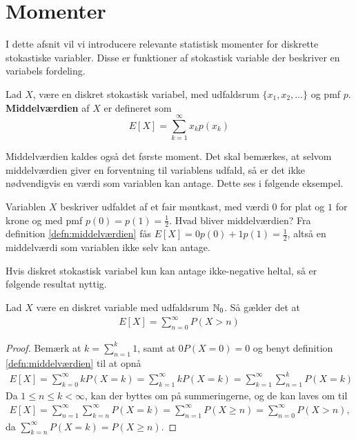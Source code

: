 \section{Momenter}
I dette afsnit vil vi introducere relevante statistisk momenter for diskrette stokastiske variabler. Disse er funktioner af stokastisk variable der beskriver en variabels fordeling. 

\begin{defn}\label{defn:middelværdien}
    Lad $X$, være en diskret stokastisk variabel, med udfaldsrum $\{x_1, x_2, \ldots\}$ og pmf $p$. \textbf{Middelværdien} af $X$ er defineret som
    \begin{equation*}
        E[X] = \sum^\infty_{k = 1} x_k p(x_k)
    \end{equation*}
\end{defn}
Middelværdien kaldes også det første moment.  Det skal bemærkes, at selvom middelværdien giver en forventning til variablens udfald, så er det ikke nødvendigvis en værdi som variablen kan antage. Dette ses i følgende eksempel.

\begin{exmp}
    Variablen $X$ beskriver udfaldet af et fair møntkast, med værdi $0$ for plat og $1$ for krone og med pmf $p(0)=p(1)=\frac{1}{2}$. Hvad bliver middelværdien? Fra definition \ref{defn:middelværdien} fås $E[X]=0p(0)+1p(1)=\frac{1}{2}$, altså en middelværdi som variablen ikke selv kan antage.
\end{exmp}

Hvis diskret stokastisk variabel kun kan antage ikke-negative heltal, så er følgende resultat nyttig.

\begin{prop} \label{prop:2.9}%
Lad $X$ være en diskret variable med udfaldsrum $\mathbb{N}_0$. Så gælder det at
\begin{align*}
    E[X] = \sum^\infty_{n = 0} P(X > n)
\end{align*}
\end{prop}
\begin{proof}
    Bemærk at $k = \sum^k_{n = 1} 1$, samt at $0P(X=0)=0$ og benyt definition \ref{defn:middelværdien} til at opnå
    \begin{align*}
        E[X] = \sum^\infty_{k = 0} k P(X = k)
        = \sum^\infty_{k = 1} k P(X = k)
        = \sum^\infty_{k = 1} \sum^k_{n = 1} P(X = k) 
\end{align*}
        Da $1\leq n \leq k < \infty$, kan der byttes om på summeringerne, og de kan laves om til
\begin{align*}
    E[X] = \sum^\infty_{n = 1} \sum^\infty_{k = n} P(X = k) = \sum^\infty_{n = 1} P(X \geq n) = \sum^\infty_{n = 0} P(X > n),
    \end{align*}
    da $\sum^\infty_{k = n} P(X = k) = P(X \geq n)$. 
\end{proof}

